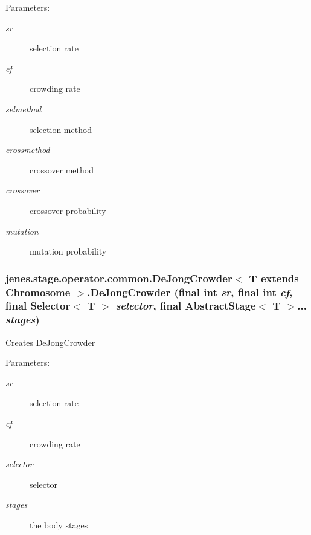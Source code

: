 \begin{Desc}
\item[Parameters:]
\begin{description}
\item[{\em sr}]selection rate \item[{\em cf}]crowding rate \item[{\em selmethod}]selection method \item[{\em crossmethod}]crossover method \item[{\em crossover}]crossover probability \item[{\em mutation}]mutation probability \end{description}
\end{Desc}
\hypertarget{classjenes_1_1stage_1_1operator_1_1common_1_1_de_jong_crowder_3_01_t_01extends_01_chromosome_01_4_97d47f09a66cf05e1cfb7630410de686}{
\subsubsection[DeJongCrowder]{\setlength{\rightskip}{0pt plus 5cm}jenes.stage.operator.common.DeJongCrowder$<$ T extends Chromosome $>$.DeJongCrowder (final int {\em sr}, \/  final int {\em cf}, \/  final Selector$<$ T $>$ {\em selector}, \/  final AbstractStage$<$ T $>$... {\em stages})}}
\label{classjenes_1_1stage_1_1operator_1_1common_1_1_de_jong_crowder_3_01_t_01extends_01_chromosome_01_4_97d47f09a66cf05e1cfb7630410de686}


Creates DeJongCrowder

\begin{Desc}
\item[Parameters:]
\begin{description}
\item[{\em sr}]selection rate \item[{\em cf}]crowding rate \item[{\em selector}]selector \item[{\em stages}]the body stages \end{description}
\end{Desc}


